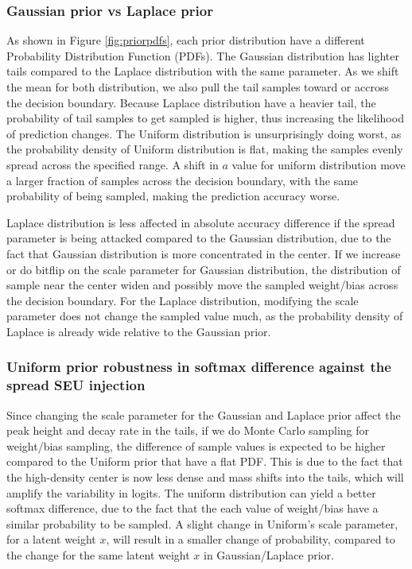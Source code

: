 \documentclass[ %
                    author={Revalda Putawara},
                supervisor={Dr. James Pope},
                    degree={MSc},
                     title={Robustness of Bayesian Neural Networks Design Choices Against Weight and Bias Perturbation Induced by Single Event Upsets (SEUs)},
                      type={},
                      year={2025}]{dissertation}
\begin{document}
\subsubsection{Gaussian prior vs Laplace prior}


As shown in Figure \ref{fig:priorpdfs}, each prior distribution have a different Probability Distribution Function (PDFs). The Gaussian distribution has lighter tails compared to the Laplace distribution with the same parameter. As we shift the mean for both distribution, we also pull the tail samples toward or accross the decision boundary. Because Laplace distribution have a heavier tail, the probability of tail samples to get sampled is higher, thus increasing the likelihood of prediction changes. The Uniform distribution is unsurprisingly doing worst, as the probability density of Uniform distribution is flat, making the samples evenly spread across the specified range. A shift in $a$ value for uniform distribution move a larger fraction of samples across the decision boundary, with the same probability of being sampled, making the prediction accuracy worse.


Laplace distribution is less affected in absolute accuracy difference if the spread parameter is being attacked compared to the Gaussian distribution, due to the fact that Gaussian distribution is more concentrated in the center. If we increase or do bitflip on the scale parameter for Gaussian distribution, the distribution of sample near the center widen and possibly move the sampled weight/bias across the decision boundary. For the Laplace distribution, modifying the scale parameter does not change the sampled value much, as the probability density of Laplace is already wide relative to the Gaussian prior. 

\subsubsection{Uniform prior robustness in softmax difference against the spread SEU injection}

Since changing the scale parameter for the Gaussian and Laplace prior affect the peak height and decay rate in the tails, if we do Monte Carlo sampling for weight/bias sampling, the difference of sample values is expected to be higher compared to the Uniform prior that have a flat PDF. This is due to the fact that the high-density center is now less dense and mass shifts into the tails, which will amplify the variability in logits. The uniform distribution can yield a better softmax difference, due to the fact that the each value of weight/bias have a similar probability to be sampled. A slight change in Uniform's scale parameter, for a latent weight $x$, will result in a smaller change of probability, compared to the change for the same latent weight $x$ in Gaussian/Laplace prior.
\end{document}
